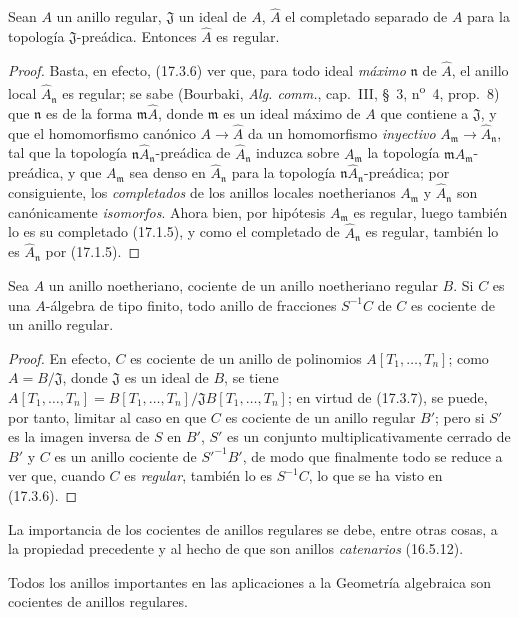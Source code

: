 \begin{lemma}[17.3.8.1]
\label{0.17.3.8.1-fr}
Sean $A$ un anillo regular, $\mathfrak{J}$ un ideal de $A$,
$\widehat{A}$ el completado separado de $A$ para la topología
$\mathfrak{J}$-preádica. Entonces $\widehat{A}$ es regular.
\end{lemma}

\begin{proof}
Basta, en efecto, (17.3.6) ver que, para todo ideal \emph{máximo}
$\mathfrak{n}$ de $\widehat{A}$, el anillo local
$\widehat{A}_{\mathfrak{n}}$ es regular; se sabe (Bourbaki,
\emph{Alg. comm.}, cap.~III, \S~3, n\textsuperscript{o}~4, prop.~8) que
$\mathfrak{n}$
es de la forma $\mathfrak{m}\widehat{A}$, donde $\mathfrak{m}$ es un ideal
máximo de $A$ que contiene a $\mathfrak{J}$, y que el homomorfismo canónico
$A\to\widehat{A}$ da un homomorfismo \emph{inyectivo}
$A_{\mathfrak{m}}\to\widehat{A}_{\mathfrak{n}}$, tal que la topología
$\mathfrak{n}\widehat{A}_{\mathfrak{n}}$-preádica de
$\widehat{A}_{\mathfrak{n}}$ induzca sobre $A_{\mathfrak{m}}$ la topología
$\mathfrak{m}A_{\mathfrak{m}}$-preádica, y que $A_{\mathfrak{m}}$ sea denso
en $\widehat{A}_{\mathfrak{n}}$ para la topología
$\mathfrak{n}\widehat{A}_{\mathfrak{n}}$-preádica; por consiguiente, los
\emph{completados} de los anillos locales noetherianos $A_{\mathfrak{m}}$ y
$\widehat{A}_{\mathfrak{n}}$ son canónicamente \emph{isomorfos}. Ahora bien,
por hipótesis $A_{\mathfrak{m}}$ es regular, luego también lo es su completado
(17.1.5), y como el completado de $\widehat{A}_{\mathfrak{n}}$ es regular,
también lo es $\widehat{A}_{\mathfrak{n}}$ por (17.1.5).
\end{proof}

\begin{corollary}[17.3.9]
\label{0.17.3.9-fr}
Sea $A$ un anillo noetheriano, cociente de un anillo noetheriano regular $B$.
Si $C$ es una $A$-álgebra de tipo finito, todo anillo de fracciones $S^{-1}C$
de $C$ es cociente de un anillo regular.
\end{corollary}

\begin{proof}
En efecto, $C$ es cociente de un anillo de polinomios $A[T_1,\ldots,T_n]$;
como $A=B/\mathfrak{J}$, donde $\mathfrak{J}$ es un ideal de $B$, se tiene
$A[T_1,\ldots,T_n]=B[T_1,\ldots,T_n]/\mathfrak{J}B[T_1,\ldots,T_n]$; en
virtud de (17.3.7), se puede, por tanto, limitar al caso en que $C$ es cociente
de un anillo regular $B'$; pero si $S'$ es la imagen inversa de $S$ en $B'$,
$S'$ es un conjunto multiplicativamente cerrado de $B'$ y $C$ es un anillo
cociente de $S'^{-1}B'$, de modo que finalmente todo se reduce a ver que,
cuando $C$ es \emph{regular}, también lo es $S^{-1}C$, lo que se ha visto en
(17.3.6).
\end{proof}

La importancia de los cocientes de anillos regulares se debe, entre otras
cosas, a la propiedad precedente y al hecho de que son anillos
\emph{catenarios} (16.5.12).

Todos los anillos importantes en las aplicaciones a la Geometría algebraica
son cocientes de anillos regulares.
